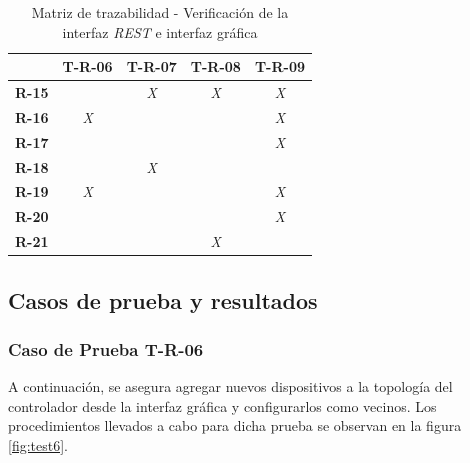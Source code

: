 \begin{table}[!h]
    \centering
    \begin{tabular}{|c|c|c|c|c|}
      \hline
      \textbf{}     & \textbf{T-R-06} & \textbf{T-R-07}    & \textbf{T-R-08} & \textbf{T-R-09} \\ \hline
      \textbf{R-15} & \textit{}       & \textit{X}         & \textit{X}      & \textit{X}      \\ \hline
      \textbf{R-16} & \textit{X}      & \textit{}          & \textit{}       & \textit{X}      \\ \hline
      \textbf{R-17} & \textit{}       & \textit{\textbf{}} & \textit{}       & \textit{X}      \\ \hline
      \textbf{R-18} & \textit{}       & \textit{X}         & \textit{}       & \textit{}       \\ \hline
      \textbf{R-19} & \textit{X}      & \textit{}          & \textit{}       & \textit{X}      \\ \hline
      \textbf{R-20} & \textit{}       & \textit{}          & \textit{}       & \textit{X}      \\ \hline
      \textbf{R-21} & \textit{}       & \textit{}          & \textit{X}      & \textit{}       \\ \hline
      \end{tabular}
    \caption{Matriz de trazabilidad - Verificación de la interfaz \textit{REST} e interfaz gráfica}
    \label{tab:matriz_rest}
\end{table}


\subsection{Casos de prueba y resultados}

\subsubsection{Caso de Prueba T-R-06}

A continuación, se asegura agregar nuevos dispositivos a la topología del controlador desde la interfaz gráfica y configurarlos como vecinos. Los procedimientos llevados a cabo para dicha prueba se observan en la figura \ref{fig:test6}.


